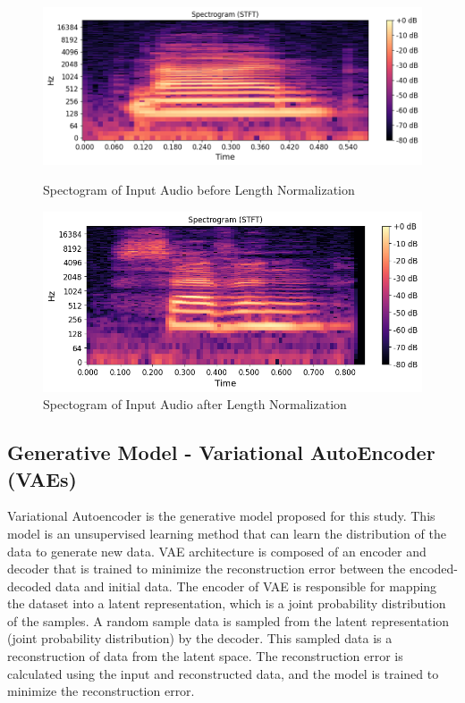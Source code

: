 \documentclass[12pt]{article}
\begin{document}
\begin{figure}[htbp]
    \centering
    \begin{minipage}[b]{0.45\linewidth}
        \centering
        \includegraphics[width=\linewidth]{figures/spectogram.png}
        \caption{Spectogram of Input Audio before Length Normalization}
        \label{fig:high_freedom}
    \end{minipage}
    \hfill
    \begin{minipage}[b]{0.4\linewidth}
        \centering
        \includegraphics[width=\linewidth]{figures/spectogram after normalization.png}
        \caption{Spectogram of Input Audio  after Length Normalization}
        \label{fig:least_freedom}
    \end{minipage}
\end{figure}





\subsection{Generative Model - Variational AutoEncoder (VAEs)}
Variational Autoencoder is the generative model proposed for this study. This model is an unsupervised learning method that can learn the distribution of the data to generate new data. VAE architecture is composed of an encoder and decoder that is trained to minimize the reconstruction error between the encoded-decoded data and initial data. The encoder of VAE is responsible for mapping the dataset into a latent representation, which is a joint probability distribution of the samples. A random sample data is sampled from the latent representation (joint probability distribution) by the decoder. This sampled data is a reconstruction of data from the latent space. The reconstruction error is calculated using the input and reconstructed data, and the model is trained to minimize the reconstruction error. \cite{Goodfellow2016Deep}
\end{document}
